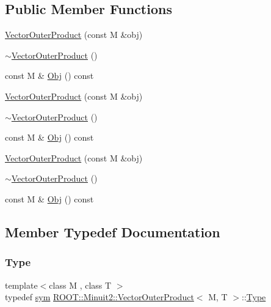\subsection*{Public Member Functions}
\begin{DoxyCompactItemize}
\item 
\mbox{\hyperlink{classROOT_1_1Minuit2_1_1VectorOuterProduct_a401cdb635db5f6721ea2dd675c5a979e}{Vector\+Outer\+Product}} (const M \&obj)
\item 
\mbox{\hyperlink{classROOT_1_1Minuit2_1_1VectorOuterProduct_a866532a01279d52fad9ad3a925eb9660}{$\sim$\+Vector\+Outer\+Product}} ()
\item 
const M \& \mbox{\hyperlink{classROOT_1_1Minuit2_1_1VectorOuterProduct_a9326f6e70b3760159b6b74dded8311d3}{Obj}} () const
\item 
\mbox{\hyperlink{classROOT_1_1Minuit2_1_1VectorOuterProduct_a401cdb635db5f6721ea2dd675c5a979e}{Vector\+Outer\+Product}} (const M \&obj)
\item 
\mbox{\hyperlink{classROOT_1_1Minuit2_1_1VectorOuterProduct_a866532a01279d52fad9ad3a925eb9660}{$\sim$\+Vector\+Outer\+Product}} ()
\item 
const M \& \mbox{\hyperlink{classROOT_1_1Minuit2_1_1VectorOuterProduct_a9326f6e70b3760159b6b74dded8311d3}{Obj}} () const
\item 
\mbox{\hyperlink{classROOT_1_1Minuit2_1_1VectorOuterProduct_a401cdb635db5f6721ea2dd675c5a979e}{Vector\+Outer\+Product}} (const M \&obj)
\item 
\mbox{\hyperlink{classROOT_1_1Minuit2_1_1VectorOuterProduct_a866532a01279d52fad9ad3a925eb9660}{$\sim$\+Vector\+Outer\+Product}} ()
\item 
const M \& \mbox{\hyperlink{classROOT_1_1Minuit2_1_1VectorOuterProduct_a9326f6e70b3760159b6b74dded8311d3}{Obj}} () const
\end{DoxyCompactItemize}


\subsection{Member Typedef Documentation}
\mbox{\label{classROOT_1_1Minuit2_1_1VectorOuterProduct_aea9ef9ec90fc733d5bac6abfbf96b60e}} 
\subsubsection{\texorpdfstring{Type}{Type}\hspace{0.1cm}{\footnotesize\ttfamily [1/3]}}
{\footnotesize\ttfamily template$<$class M , class T $>$ \\
typedef \mbox{\hyperlink{classROOT_1_1Minuit2_1_1sym}{sym}} \mbox{\hyperlink{classROOT_1_1Minuit2_1_1VectorOuterProduct}{R\+O\+O\+T\+::\+Minuit2\+::\+Vector\+Outer\+Product}}$<$ M, T $>$\+::\mbox{\hyperlink{classROOT_1_1Minuit2_1_1VectorOuterProduct_aea9ef9ec90fc733d5bac6abfbf96b60e}{Type}}}

